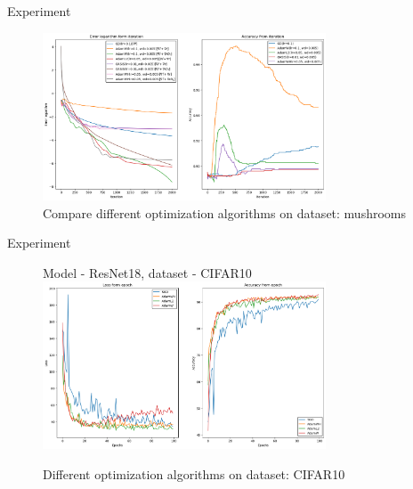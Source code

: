 \documentclass[aspectratio=169, 12pt]{beamer}
\begin{document}
\begin{frame}{Experiment}

    \begin{figure}[H]
\centering
    \includegraphics[width=0.75\textwidth]{main_mushrooms.png}
    \caption{Compare different optimization algorithms on dataset: mushrooms}
    \label{fig:main_mushrooms}
\end{figure}
\end{frame}

\begin{frame}{Experiment}
    \begin{figure}[H]
\centering Model - ResNet18, dataset - CIFAR10
    \includegraphics[width=0.75\textwidth]{nn_results.png}
    \caption{Different optimization algorithms on dataset: CIFAR10}

        \label{fig:main_resnet18}
\end{figure}
\end{frame}
\end{document}
